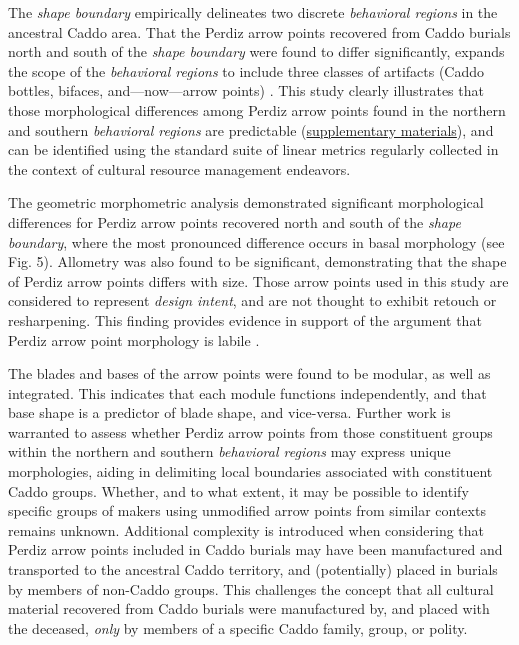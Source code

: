 \documentclass[smallextended]{svjour3}       %
\begin{document}
The \emph{shape boundary} empirically delineates two discrete
\emph{behavioral regions} in the ancestral Caddo area. That the Perdiz
arrow points recovered from Caddo burials north and south of the
\emph{shape boundary} were found to differ significantly, expands the
scope of the \emph{behavioral regions} to include three classes of
artifacts (Caddo bottles, bifaces, and---now---arrow points)
\cite{RN8074,RN7927,RN8370,RN8312,RN8322,RN8158}. This study clearly
illustrates that those morphological differences among Perdiz arrow
points found in the northern and southern \emph{behavioral regions} are
predictable (\href{https://seldenlab.github.io/perdiz3/}{supplementary
materials}), and can be identified using the standard suite of linear
metrics regularly collected in the context of cultural resource
management endeavors.

The geometric morphometric analysis demonstrated significant
morphological differences for Perdiz arrow points recovered north and
south of the \emph{shape boundary}, where the most pronounced difference
occurs in basal morphology (see Fig. 5). Allometry was also found to be
significant, demonstrating that the shape of Perdiz arrow points differs
with size. Those arrow points used in this study are considered to
represent \emph{design intent}, and are not thought to exhibit retouch
or resharpening. This finding provides evidence in support of the
argument that Perdiz arrow point morphology is labile \cite{RN9364}.

The blades and bases of the arrow points were found to be modular, as
well as integrated. This indicates that each module functions
independently, and that base shape is a predictor of blade shape, and
vice-versa. Further work is warranted to assess whether Perdiz arrow
points from those constituent groups within the northern and southern
\emph{behavioral regions} may express unique morphologies, aiding in
delimiting local boundaries associated with constituent Caddo groups.
Whether, and to what extent, it may be possible to identify specific
groups of makers using unmodified arrow points from similar contexts
remains unknown. Additional complexity is introduced when considering
that Perdiz arrow points included in Caddo burials may have been
manufactured and transported to the ancestral Caddo territory, and
(potentially) placed in burials by members of non-Caddo groups. This
challenges the concept that all cultural material recovered from Caddo
burials were manufactured by, and placed with the deceased, \emph{only}
by members of a specific Caddo family, group, or polity.
\end{document}
